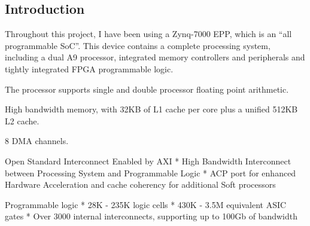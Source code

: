 \subsection{Introduction}
\label{hardware:introduction}
Throughout this project, I have been using a \Xilinx{} Zynq-7000 EPP, which is
an ``all programmable \gls{SoC}''. This device contains a complete \ARM{}
processing system, including a dual \ARM{} \Cortex{} A9 processor, integrated
memory controllers and peripherals and tightly integrated \gls{FPGA}
programmable logic.

The processor supports single and double processor floating point arithmetic.

High bandwidth memory, with 32KB of L1 cache per core plus a unified 512KB L2
cache.

8 \gls{DMA} channels.

Open Standard Interconnect Enabled by AXI
* High Bandwidth Interconnect between Processing System and Programmable Logic
* ACP port for enhanced Hardware Acceleration and cache coherency for additional Soft processors

Programmable logic
* 28K - 235K logic cells
* 430K - 3.5M equivalent \gls{ASIC} gates
* Over 3000 internal interconnects, supporting up to 100Gb of bandwidth
